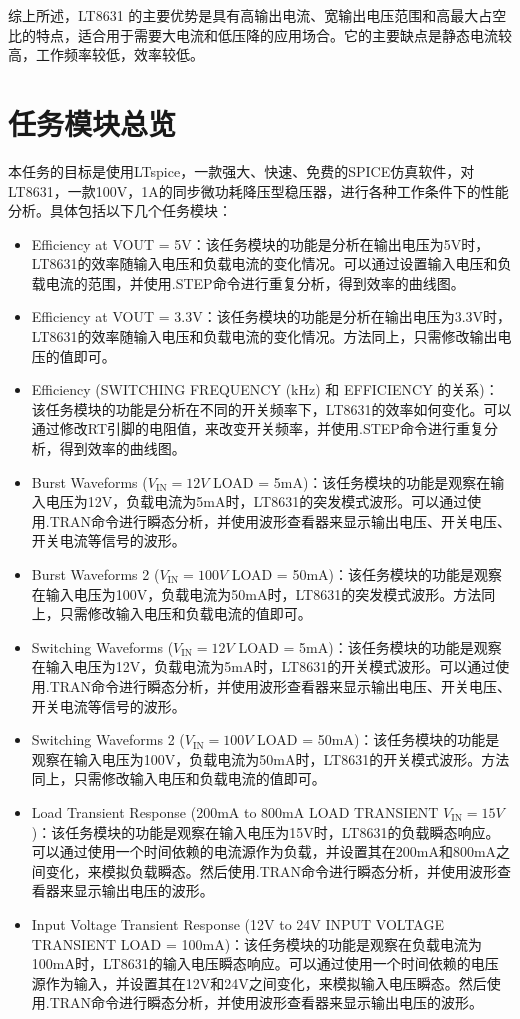 \documentclass[lang=cn,10pt]{elegantbook}
\begin{document}
综上所述，LT8631 的主要优势是具有高输出电流、宽输出电压范围和高最大占空比的特点，适合用于需要大电流和低压降的应用场合。它的主要缺点是静态电流较高，工作频率较低，效率较低。

\chapter{任务模块总览}

本任务的目标是使用LTspice，一款强大、快速、免费的SPICE仿真软件，对LT8631，一款100V，1A的同步微功耗降压型稳压器，进行各种工作条件下的性能分析。\cite{bworld}具体包括以下几个任务模块：

\begin{itemize}
    \item Efficiency at VOUT = 5V：该任务模块的功能是分析在输出电压为5V时，LT8631的效率随输入电压和负载电流的变化情况。可以通过设置输入电压和负载电流的范围，并使用.STEP命令进行重复分析，得到效率的曲线图。
    \item Efficiency at VOUT = 3.3V：该任务模块的功能是分析在输出电压为3.3V时，LT8631的效率随输入电压和负载电流的变化情况。方法同上，只需修改输出电压的值即可。
    \item Efficiency (SWITCHING FREQUENCY (kHz) 和 EFFICIENCY 的关系)：该任务模块的功能是分析在不同的开关频率下，LT8631的效率如何变化。可以通过修改RT引脚的电阻值，来改变开关频率，并使用.STEP命令进行重复分析，得到效率的曲线图。
    \item Burst Waveforms ($V_{\text{IN}} = 12V$ LOAD = 5mA)：该任务模块的功能是观察在输入电压为12V，负载电流为5mA时，LT8631的突发模式波形。可以通过使用.TRAN命令进行瞬态分析，并使用波形查看器来显示输出电压、开关电压、开关电流等信号的波形。
    \item Burst Waveforms 2 ($V_{\text{IN}} = 100V$ LOAD = 50mA)：该任务模块的功能是观察在输入电压为100V，负载电流为50mA时，LT8631的突发模式波形。方法同上，只需修改输入电压和负载电流的值即可。
    \item Switching Waveforms ($V_{\text{IN}} = 12V$ LOAD = 5mA)：该任务模块的功能是观察在输入电压为12V，负载电流为5mA时，LT8631的开关模式波形。可以通过使用.TRAN命令进行瞬态分析，并使用波形查看器来显示输出电压、开关电压、开关电流等信号的波形。
    \item Switching Waveforms 2 ($V_{\text{IN}} = 100V$ LOAD = 50mA)：该任务模块的功能是观察在输入电压为100V，负载电流为50mA时，LT8631的开关模式波形。方法同上，只需修改输入电压和负载电流的值即可。
    \item Load Transient Response (200mA to 800mA LOAD TRANSIENT $V_{\text{IN}} = 15V$)：该任务模块的功能是观察在输入电压为15V时，LT8631的负载瞬态响应。可以通过使用一个时间依赖的电流源作为负载，并设置其在200mA和800mA之间变化，来模拟负载瞬态。然后使用.TRAN命令进行瞬态分析，并使用波形查看器来显示输出电压的波形。
    \item Input Voltage Transient Response (12V to 24V INPUT VOLTAGE TRANSIENT LOAD = 100mA)：该任务模块的功能是观察在负载电流为100mA时，LT8631的输入电压瞬态响应。可以通过使用一个时间依赖的电压源作为输入，并设置其在12V和24V之间变化，来模拟输入电压瞬态。然后使用.TRAN命令进行瞬态分析，并使用波形查看器来显示输出电压的波形。
\end{itemize}
\end{document}

